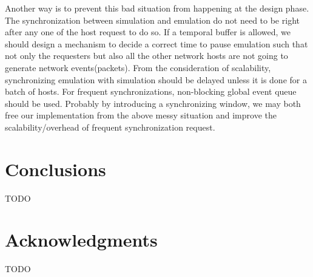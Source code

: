 \documentclass{acm_proc_article-sp}
\begin{document}
Another way is to prevent this bad situation from happening at the design phase.
The synchronization between simulation and emulation do not need to be right after any one of the host request to do so.
If a temporal buffer is allowed, we should design a mechanism to decide a correct time to pause emulation such that not only the requesters but also all the other network hosts are not going to generate network events(packets).
From the consideration of scalability, synchronizing emulation with simulation should be delayed unless it is done for a batch of hosts.
For frequent synchronizations, non-blocking global event queue should be used.
Probably by introducing a synchronizing window, we may both free our implementation from the above messy situation and improve the scalability/overhead of frequent synchronization request.


\section{Conclusions}
TODO

\section{Acknowledgments}
TODO
%


%
%
\balancecolumns
\end{document}
